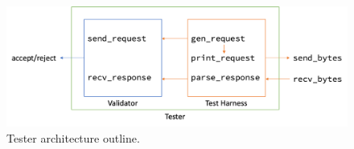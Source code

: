 \begin{figure}
  \centering
  \includegraphics[width=.9\textwidth]{figures/harness-outline}
  \caption{Tester architecture outline.}
  \label{fig:overview}
\end{figure}
